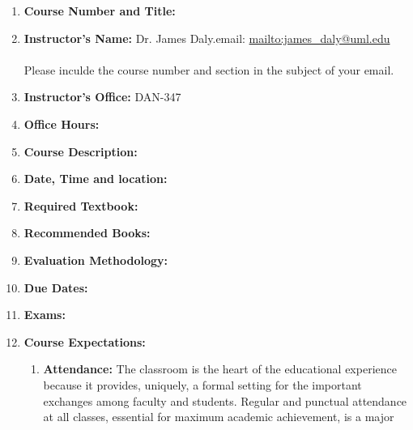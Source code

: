 \documentclass[10pt]{article}
\begin{document}
  \begin{center}\Huge

  \end{center}
  \begin{enumerate}
    \item {\bf Course Number and Title:} \courseno{} \fullcoursename{}
    \item {\bf Instructor's Name:} Dr. James Daly.\quad{}email:
      \url{mailto:james_daly@uml.edu} \\\\
      Please inculde the course number and section in the subject of
      your email.
    \item {\bf Instructor's Office:} DAN-347
    \item {\bf Office Hours:} 
      
%      
    \item {\bf Course Description:} 
      
%      
%       
      
    \item {\bf Date, Time and location:} 
      
    \item {\bf Required Textbook:} 
      
    \item {\bf Recommended Books:}
      
         \item {\bf Evaluation Methodology:}\\
       
     \item {\bf Due Dates:} 
       
     \item {\bf Exams:} 
       
    \item {\bf Course Expectations:}
       \begin{enumerate}[label=\alph*.]
         \item {\bf Attendance:}
           The classroom is the heart of the educational experience
           because it provides, uniquely, a formal 
           setting for the important exchanges among faculty and
           students. Regular and punctual attendance at all classes,
           essential for maximum academic achievement, is a major

\end{enumerate}
\end{enumerate}
\end{document}
